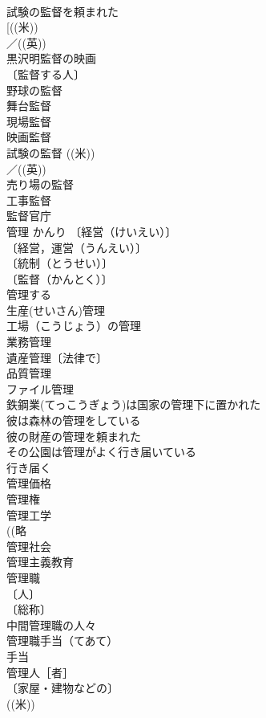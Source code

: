 \documentclass[8pt]{extreport}
\begin{document}
\begin{CJK}{UTF8}{min}
\\	試験の監督を頼まれた 
\\	[((米))
\\	／((英))
\\	黒沢明監督の映画 
\\	〔監督する人〕
\\	野球の監督 
\\	舞台監督 
\\	現場監督 
\\	映画監督 
\\	試験の監督 ((米)) 
\\	／((英)) 
\\	売り場の監督 
\\	工事監督 
\\	監督官庁 
\\	管理	かんり	〔経営（けいえい）〕
\\	〔経営，運営（うんえい）〕
\\	〔統制（とうせい）〕
\\	〔監督（かんとく）〕
\\	管理する 
\\	生産(せいさん)管理 
\\	工場（こうじょう）の管理 
\\	業務管理 
\\	遺産管理〔法律で〕 
\\	品質管理 
\\	ファイル管理 
\\	鉄鋼業(てっこうぎょう)は国家の管理下に置かれた 
\\	彼は森林の管理をしている 
\\	彼の財産の管理を頼まれた 
\\	その公園は管理がよく行き届いている 
\\	行き届く　
\\	管理価格 
\\	管理権 
\\	管理工学 
\\	((略
\\	管理社会 
\\	管理主義教育 
\\	管理職 
\\	〔人〕
\\	〔総称〕
\\	中間管理職の人々 
\\	管理職手当（てあて） 
\\	手当　
\\	管理人［者］ 
\\	〔家屋・建物などの〕
\\	((米)) 

\end{CJK}
\end{document}
